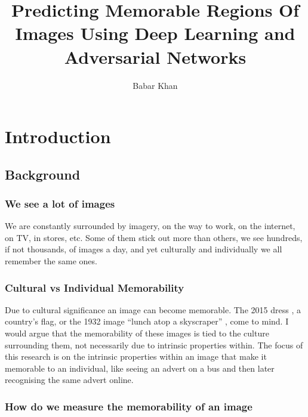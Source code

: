 \documentclass[11pt]{article}
\title{Predicting Memorable Regions Of Images Using Deep Learning and Adversarial Networks}
\author{Babar Khan}
\begin{document}
\maketitle

\newpage{}

\tableofcontents

\newpage{}

\section{Introduction}



\subsection{Background}

\subsubsection{We see a lot of images}

We are constantly surrounded by imagery, on the way to work, on the internet, on TV, in stores, etc. Some of them stick out more than others, we see hundreds, if not thousands, of images a day, and yet culturally and individually we all remember the same ones.

\subsubsection{Cultural vs Individual Memorability}

Due to cultural significance an image can become memorable. The 2015 dress \cite{BBCDress2015}, a country's flag, or the 1932 image “lunch atop a skyscraper” \cite{gambino_2012}, come to mind. I would argue that the memorability of these images is tied to the culture surrounding them, not necessarily due to intrinsic properties within. The focus of this research is on the intrinsic properties within an image that make it memorable to an individual, like seeing an advert on a bus and then later recognising the same advert online.

\subsubsection{How do we measure the memorability of an image}

\end{document}
